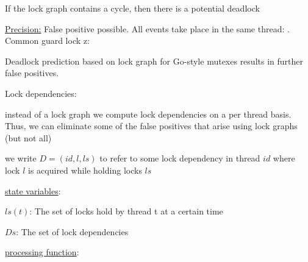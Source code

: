 \documentclass[landscape, a4paper]{article}
\begin{document}
\begin{minipage}[t]{0.2\linewidth}
\begin{betterlist}
\begin{betterlist}
			\item If the lock graph contains a cycle, then there is a potential deadlock
			\item \underline{Precision:} False positive possible. All events take place in the same thread: . Common guard lock z: 
			\begin{betterlist}
				\item Deadlock prediction based on lock graph for Go-style mutexes results in further false positives. 
			\end{betterlist}
		\end{betterlist}
		\item \alert{Lock dependencies}:
		\begin{betterlist}
			\item instead of a lock graph we compute lock dependencies on a \alert{per thread} basis. Thus, we can eliminate some of the false positives that arise using lock graphs (but not all)%
			\item we write $D = (id, l, ls)$ to refer to some lock dependency in thread $id$ where lock $l$ is acquired while holding locks $ls$
			\item \underline{state variables}:
			\begin{betterlist}
				\item $ls(t)$: The set of locks hold by thread t at a certain time
				\item $Ds$: The set of lock dependencies
			\end{betterlist}
			\item \underline{processing function}:


\end{betterlist}
\end{betterlist}
\end{minipage}
\end{document}
